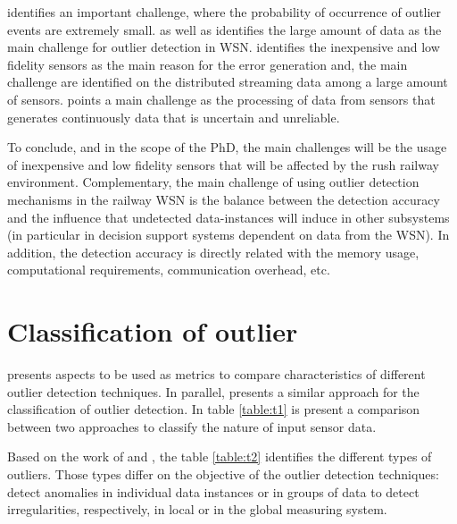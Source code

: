 \cite{class:branch:2006} identifies an important challenge, where the probability of occurrence of outlier events are extremely small. \cite{nn:abid:2016} as well as \cite{stat:sheng:2007} identifies the large amount of data as the main challenge for outlier detection in WSN. \cite{nn:zhuang:2006} identifies the inexpensive and low fidelity sensors as the main reason for the error generation and, the main challenge are identified on the distributed streaming data among a large amount of sensors. \cite{stat:ghorbel:2015} points a main challenge as the processing of data from sensors that generates continuously data that is uncertain and unreliable. 

To conclude, and in the scope of the PhD, the main challenges will be the usage of inexpensive and low fidelity sensors that will be affected by the rush railway environment. Complementary, the main challenge of using outlier detection mechanisms in the railway WSN is the balance between the detection accuracy and the influence that undetected data-instances will induce in other subsystems (in particular in decision support systems dependent on data from the WSN). In addition, the detection accuracy is directly related with the memory usage, computational requirements, communication overhead, etc. 


\newpage

\section{Classification of outlier}
\label{sec:classint}
\cite{gen:zhang:2010} presents aspects to be used as metrics to compare characteristics of different outlier detection techniques. In parallel, \cite{gen:chandola:2009} presents a similar approach for the classification of outlier detection. 
In table \ref{table:t1} is present a comparison between two approaches to classify the nature of input sensor data.

	
%
	

Based on the work of \cite{gen:zhang:2010} and \cite{gen:chandola:2009}, the table \ref{table:t2} identifies the different types of outliers. 
Those types differ on the objective of the outlier detection techniques: detect anomalies in individual data instances or in groups of data to detect irregularities, respectively, in local or in the global measuring system.

%

\newpage


